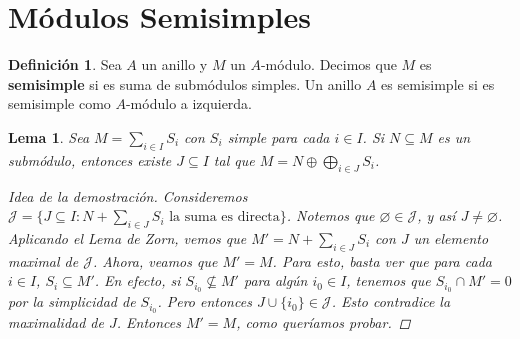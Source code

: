 \documentclass[12pt]{book}
\newtheorem{lem}[teo]{Lema}
\theoremstyle{definition}
\newtheorem{defn}[teo]{Definición}
\let\emptyset\varnothing
\begin{document}
\section{Módulos Semisimples}

\begin{defn}
Sea $A$ un anillo y $M$ un $A$-módulo. Decimos que $M$ es \textbf{semisimple} si es suma de submódulos simples. Un anillo $A$ es semisimple si es semisimple como $A$-módulo a izquierda.
\end{defn}

\begin{lem}
Sea $M=\displaystyle\sum_{i\in I}S_i$ con $S_i$ simple para cada $i\in I$. Si $N\subseteq M$ es un submódulo, entonces existe $J\subseteq I$ tal que $M=N \oplus \displaystyle\bigoplus_{i\in J}S_i$.
\begin{proof}[Idea de la demostración]
Consideremos $\mathcal{J}=\{J\subseteq I : N+\displaystyle\sum_{i\in J}S_i \text{ la suma es directa}\}$. Notemos que $\emptyset\in \mathcal{J}$, y así $J\neq \emptyset$. Aplicando el Lema de Zorn, vemos que $M' = N + \displaystyle\sum_{i\in J}S_i$ con $J$ un elemento maximal de $\mathcal{J}$. Ahora, veamos que $M'=M$. Para esto, basta ver que para cada $i\in I$, $S_i\subseteq M'$. En efecto, si $S_{i_0}\not\subseteq M'$ para algún $i_0\in I$, tenemos que $S_{i_0}\cap M'=0$ por la simplicidad de $S_{i_0}$. Pero entonces $J\cup \{i_0\}\in\mathcal{J}$. Esto contradice la maximalidad de $J$. Entonces $M'=M$, como queríamos probar.
\end{proof}
\end{lem}
\end{document}
